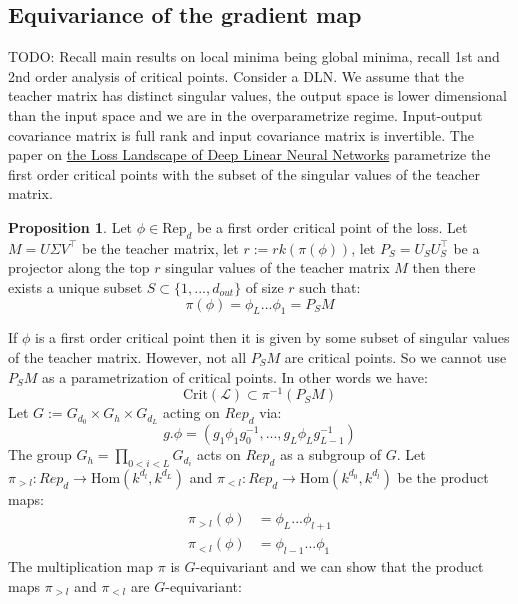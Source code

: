 \documentclass{article}
\theoremstyle{definition}
\newtheorem{proposition}[theorem]{Proposition}
\begin{document}
\subsection{Equivariance of the gradient map}
TODO: Recall main results on local minima being global minima, recall 1st and 2nd order analysis of critical points.
Consider a DLN. We assume that the teacher matrix has distinct singular values, the output space is lower dimensional than the input space and we are in the overparametrize regime. Input-output covariance matrix is full rank and input covariance matrix is invertible. The paper on \href{https://arxiv.org/pdf/2107.13289}{the Loss Landscape of Deep Linear Neural Networks} parametrize the first order critical points with the subset of the singular values of the teacher matrix.
\begin{proposition}
    Let $\phi\in\text{Rep}_d$ be a first order critical point of the loss. Let $M=U\Sigma V^{\top}$ be the teacher matrix, let $r:=rk(\pi(\phi))$, let $P_S = U_SU_S^{\top}$ be a projector along the top $r$ singular values of the teacher matrix $M$ then there exists a unique subset $S\subset \{1,...,d_{out}\}$ of size $r$ such that:
    \begin{equation*}
        \pi(\phi) = \phi_L...\phi_1 = P_SM
    \end{equation*}
\end{proposition}
If $\phi$ is a first order critical point then it is given by some subset of singular values of the teacher matrix. However, not all $P_SM$ are critical points. So we cannot use $P_SM$ as a parametrization of critical points. In other words we have:
\begin{equation*}
    \text{Crit}(\mathcal{L}) \subset \pi^{-1}(P_SM)
\end{equation*}
Let $G:=G_{d_0}\times G_h \times G_{d_L}$ acting on $Rep_d$ via:
\begin{equation*}
    g.\phi = (g_1\phi_1g_0^{-1},...,g_{L}\phi_L g_{L-1}^{-1})
\end{equation*}
The group $G_h=\prod_{0<i<L} G_{d_i}$ acts on $Rep_d$ as a subgroup of $G$.  Let $\pi_{>l}:Rep_d \to \text{Hom}(k^{d_{l}}, k^{d_L})$ and $\pi_{<l}:Rep_d \to \text{Hom}(k^{d_0}, k^{d_{l}})$ be the product maps:
\begin{align*}
    \pi_{>l}(\phi) & = \phi_L...\phi_{l+1}\\
    \pi_{<l}(\phi) & = \phi_{l-1}...\phi_{1}
\end{align*}
The multiplication map $\pi$ is $G$-equivariant and we can show that the product maps $\pi_{>l}$ and $\pi_{<l}$ are $G$-equivariant:
\end{document}
